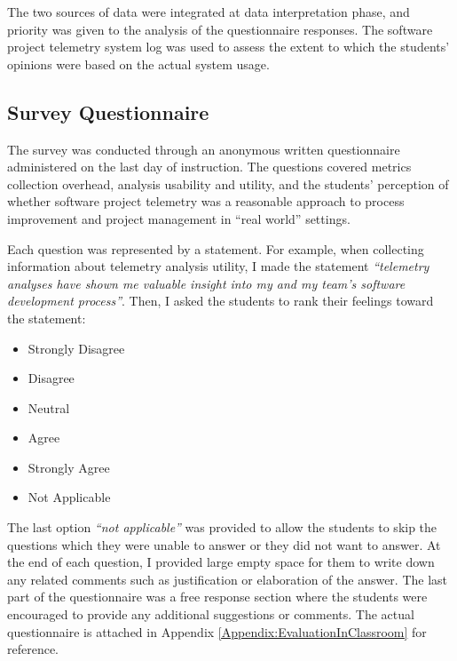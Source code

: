The two sources of data were integrated at data interpretation phase, and priority was given to the analysis of the questionnaire responses. The software project telemetry system log was used to assess the extent to which the students' opinions were based on the actual system usage.




\subsection{Survey Questionnaire} \label{EvaluationInClassroom:Survey}

The survey was conducted through an anonymous written questionnaire administered on the last day of instruction. The questions covered metrics collection overhead, analysis usability and utility, and the students' perception of whether software project telemetry was a reasonable approach to process improvement and project management in ``real world'' settings.

Each question was represented by a statement. For example, when collecting information about telemetry analysis utility, I made the statement \textit{``telemetry analyses have shown me valuable insight into my and my team's software development process''}. Then, I asked the students to rank their feelings toward the statement:

\begin{itemize}
  \setlength{\itemsep}{0pt}
  \setlength{\parskip}{0pt}
	\item Strongly Disagree
	\item Disagree
	\item Neutral
	\item Agree
	\item Strongly Agree
	\item Not Applicable
\end{itemize}

The last option \textit{``not applicable''} was provided to allow the students to skip the questions which they were unable to answer or they did not want to answer. At the end of each question, I provided large empty space for them to write down any related comments such as justification or elaboration of the answer. The last part of the questionnaire was a free response section where the students were encouraged to provide any additional suggestions or comments. The actual questionnaire is attached in Appendix \ref{Appendix:EvaluationInClassroom} for reference.


